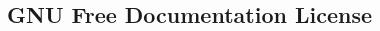 \documentclass[class=book, crop=false]{standalone}
\begin{document}
\begin{CJK}{UTF8}{gbsn}

\chapter{GNU Free Documentation License}



\cleardoublepage

\end{CJK}
\end{document}
